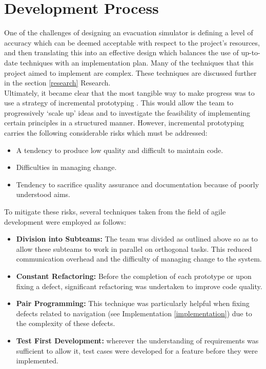 \section{Development Process}
\label{Team:subsec:process}
One of the challenges of designing an evacuation simulator is defining a level of accuracy which can be deemed acceptable with respect to the project's resources, and then translating this into an effective design which balances the use of up-to-date techniques with an implementation plan. Many of the techniques that this project aimed to implement are complex. These techniques are discussed further in the section \ref{research} Research.\\
Ultimately, it became clear that the most tangible way to make progress was to use a strategy of incremental prototyping \cite[Ch 2.3.2]{SommervilleSoftwareEng}. This would allow the team to progressively `scale up' ideas and to investigate the feasibility of implementing certain principles in a structured manner. However, incremental prototyping carries the following considerable risks which must be addressed:
\begin{itemize}
\item A tendency to produce low quality and difficult to maintain code.
\item Difficulties in managing change.
\item Tendency to sacrifice quality assurance and documentation because of poorly understood aims.
\end{itemize}

To mitigate these risks, several techniques taken from the field of agile development \cite[Ch. 3]{SommervilleSoftwareEng} were employed as follows:
\begin{itemize}
\item \textbf{Division into Subteams:} The team was divided as outlined above so as to allow these subteams to work in parallel on orthogonal tasks. This reduced communication overhead and the difficulty of managing change to the system.
\item \textbf{Constant Refactoring:} Before the completion of each prototype or upon fixing a defect, significant refactoring was undertaken to improve code quality.
\item \textbf{Pair Programming:} This technique was particularly helpful when fixing defects related to navigation (see Implementation \ref{implementation}) due to the complexity of these defects.
\item \textbf{Test First Development:} wherever the understanding of requirements was sufficient to allow it, test cases were developed for a feature before they were implemented.
\end{itemize}

%
